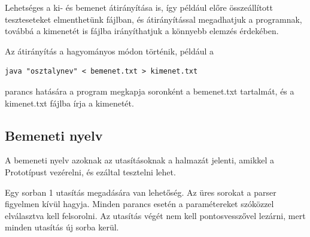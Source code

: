 Lehetséges a ki- és bemenet átirányítása is, így például előre összeállított teszteseteket elmenthetünk fájlban, és átirányítással megadhatjuk a programnak, továbbá a kimenetét is fájlba irányíthatjuk a könnyebb elemzés érdekében. 

Az átirányítás a hagyományos módon történik, például a 
\begin{lstlisting}
java "osztalynev" < bemenet.txt > kimenet.txt
\end{lstlisting}
parancs hatására a program megkapja soronként a bemenet.txt tartalmát, és a kimenet.txt fájlba írja a kimenetét.

\subsection{Bemeneti nyelv}
A bemeneti nyelv azoknak az utasításoknak a halmazát jelenti, amikkel a Prototípust vezérelni, és ezáltal tesztelni lehet.

Egy sorban 1 utasítás megadására van lehetőség. Az üres sorokat a parser figyelmen kívül hagyja. Minden parancs esetén a paramétereket szóközzel elválasztva kell felsorolni. Az utasítás végét nem kell pontosvesszővel lezárni, mert minden utasítás új sorba kerül.

